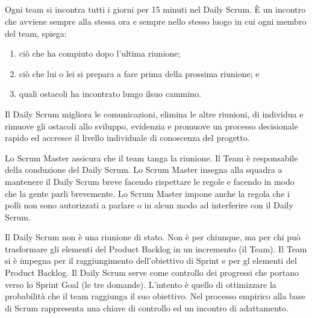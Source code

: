 \subsection*{\color{Blue}{DAILY SCRUM}}
\label{sec:dailyscrum}
Ogni team si incontra tutti i giorni per 15 minuti nel Daily Scrum. \`E un incontro che avviene sempre alla stessa ora
e sempre nello stesso luogo in cui ogni membro del team, spiega:
\begin{enumerate}
	\item ci\`o che  ha compiuto dopo l'ultima riunione;
	\item ci\`o che lui o lei si prepara a fare prima della prossima riunione; e
	\item quali ostacoli ha incontrato lungo ilsuo cammino.
\end{enumerate}

Il Daily Scrum migliora le comunicazioni, elimina le altre riunioni, di individua e rimuove gli ostacoli allo sviluppo,
evidenzia e promuove un processo decisionale rapido ed accresce il livello individuale di conoscenza del progetto.
\newline

Lo Scrum Master assicura che il team tanga la riunione. Il Team \`e responsabile della conduzione del Daily Scrum. Lo
Scrum Master insegna alla squadra a mantenere il Daily Scrum breve facendo rispettare le regole e facendo in modo che
la gente parli brevemente. Lo Scrum Master impone anche la regola che i polli non sono autorizzati a parlare o in alcun
modo ad interferire con il Daily Scrum.
 \newline

Il Daily Scrum non \`e una riunione di stato. Non \`e per chiunque, ma per chi pu\`o trasformare gli elementi del
Product Backlog in un incremento (il Team). Il Team si \`e impegna per il raggiungimento dell'obiettivo di Sprint e per
gl elementi del Product Backlog. Il Daily Scrum serve come controllo dei progressi che portano verso lo Sprint Goal (le
tre domande). L'intento \`e quello di ottimizzare la probabilit\`a che il team raggiunga il suo obiettivo. Nel processo
empirico alla base di Scrum rappresenta una chiave di controllo ed un incontro di adattamento.